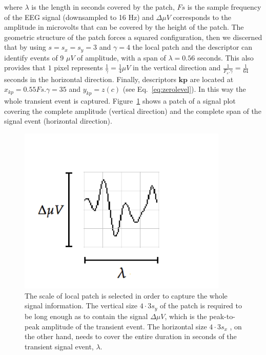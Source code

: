 \documentclass[entropy,article,submit,moreauthors,pdftex,10pt,a4paper]{mdpi}
\begin{document}
\noindent where $ \lambda $ is the length in seconds covered by the patch, $ Fs $ is the sample frequency of the EEG signal (downsampled to 16 Hz) and  $\Delta  \mu V $ corresponds to the amplitude in microvolts that can be covered by the height of the patch. The geometric structure of the patch forces a squared configuration, then we discerned that by using $ s =s_x =s_y = 3 $ and $ \gamma = 4 $  the local patch and the descriptor can identify events of 9 $ \mu V $ of amplitude, with a span of $ \lambda = 0.56$ seconds.  This also provides that $ 1 $ pixel represents $ \frac{1}{\gamma}= \frac{1}{4} \mu V $ in the vertical direction and $\frac{1}{F_s.\gamma}=\frac{1}{64}$ seconds in the horizontal direction. Finally, descriptors  $\mathbf{kp}$  are located at $ x_{kp} =  0.55 Fs.\gamma = 35 $ and $ y_{kp} = z(c) $ (see Eq.~\ref{eq:zerolevel}).   In this way the whole transient event is captured. 
Figure~\ref{fig:sampledescriptor2} shows a patch of a signal plot covering the complete amplitude (vertical direction) and the complete span of the signal event (horizontal direction). 
\begin{figure}[H]
\centering
\includegraphics[width=10cm]{patchgeometry.pdf}
\caption{The scale of local patch is selected in order to capture the whole signal information.  The vertical size $4 \cdot 3 s_y$ of the patch is required to be long enough as to contain the signal $\Delta  \mu V $, which is the peak-to-peak amplitude of the transient event. The horizontal size $ 4 \cdot 3 s_x$ , on the other hand, needs to cover the entire duration in seconds of the transient signal event, $ \lambda $.   }
\label{fig:sampledescriptor2}
\end{figure}

\end{document}
